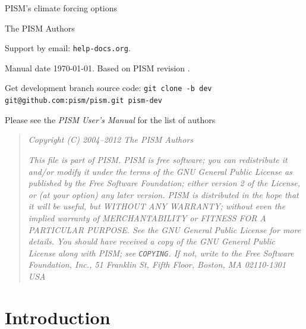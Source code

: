 \documentclass[titlepage,letterpaper,final]{scrartcl}
\makeatletter
\newcommand{\PISMREV}{revision }
\newcommand{\PISMDOWNLOADMSG}{Get development branch source code: \quad\texttt{git clone -b dev git@github.com:pism/pism.git pism-dev} \quad}
\makeatother
\begin{document}
\begin{titlepage}

  \begin{center}
    \vspace*{3.5cm}
    {\huge{} PISM's climate forcing options}
    \vspace{0.5cm}

    {\Large The PISM Authors}
    \vspace{1cm}

    \vfill

    \small Support by email: \texttt{help\@@pism-docs.org}. 
    \medskip

    Manual date \today. Based on PISM \PISMREV.
    \medskip

    \PISMDOWNLOADMSG
  \end{center}
\end{titlepage}

\newpage
\phantom{bob}

\begin{center}
  Please see the \emph{PISM User's Manual} for the list of authors
\end{center}

\vspace{0.2in}
\begin{quote}
  \textsl{Copyright (C) 2004--2012 The PISM Authors}
  \medskip

  \noindent \textsl{This file is part of PISM.  PISM is free software; you can redistribute it and/or modify it under the terms of the GNU General Public License as published by the Free Software Foundation; either version 2 of the License, or (at your option) any later version.  PISM is distributed in the hope that it will be useful, but WITHOUT ANY WARRANTY; without even the implied warranty of MERCHANTABILITY or FITNESS FOR A PARTICULAR PURPOSE.  See the GNU General Public License for more details.  You should have received a copy of the GNU General Public License along with PISM; see \emph{\texttt{COPYING}}.  If not, write to the Free Software Foundation, Inc., 51 Franklin St, Fifth Floor, Boston, MA  02110-1301 USA}
\end{quote}

\newpage
\setcounter{tocdepth}{3}
\small
\tableofcontents
\normalsize

\newpage


\section{Introduction}\label{sect:intro}
\end{document}
